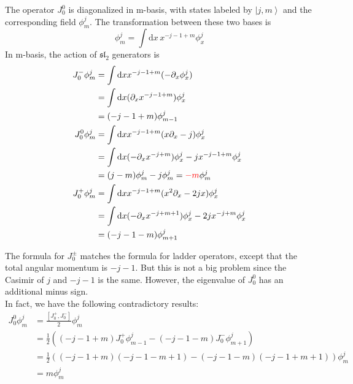 \documentclass[10pt,a4paper]{article}
\numberwithin{equation}{section}
\newcommand{\ket}[1]{\left| #1 \right\rangle}
\begin{document}
The operator $J^{0}_{0}$ is diagonalized in m-basis, with states labeled by $\ket{j,m}$ and the corresponding field $\phi^{j}_{m}$.
The transformation between these two bases is
\begin{equation}
    \phi^{j}_{m} = \int \mathrm{d} x \, x^{-j-1+m} \phi^{j}_{x}
\end{equation}
In m-basis, the action of $\mathfrak{sl}_{2}$ generators is 
\begin{equation}
    \begin{aligned}
    J^{-}_{0} \phi^{j}_{m} &= \int \mathrm{d} x x^{-j-1+m} (- \partial_{x} \phi^{j}_{x})\\
    &= \int \mathrm{d} x (\partial_{x} x^{-j-1+m}) \phi^{j}_{x}\\
    &= (-j-1+m) \phi^{j}_{m-1}\\
    J^{0}_{0} \phi^{j}_{m} &= \int \mathrm{d} x x^{-j-1+m} (x \partial_{x}-j) \phi^{j}_{x}\\
    &= \int \mathrm{d} x (-\partial_{x} x^{-j+m}) \phi^{j}_{x} -j x^{-j-1+m} \phi^{j}_{x}\\
    &= (j-m)\phi^{j}_{m} - j \phi^{j}_{m} = \textcolor{red}{-m} \phi^{j}_{m}\\
    J^{+}_{0} \phi^{j}_{m} &= \int \mathrm{d} x x^{-j-1+m} (x^{2} \partial_{x}-2jx) \phi^{j}_{x}\\
    &= \int \mathrm{d} x (-\partial_{x} x^{-j+m+1}) \phi^{j}_{x} - 2j x^{-j+m} \phi^{j}_{x}\\
    &= (-j-1-m) \phi^{j}_{m+1}
    \end{aligned}
\end{equation}

The formula for $J^{\pm}_{0}$ matches the formula for ladder operators, except that the total angular momentum is $-j-1$. But this is not 
a big problem since the Casimir of $j$ and $-j-1$ is the same. However, the eigenvalue of $J^{0}_{0}$ has an additional minus sign.\\
In fact, we have the following contradictory results:
\begin{equation}
    \begin{aligned}
    J^{0}_{0} \phi^{j}_{m} &= \frac{\left[ J^{+}_{0},J^{-}_{0}\right]}{2} \phi^{j}_{m}\\
    &= \frac{1}{2}\left( (-j-1+m) J^{+}_{0} \phi^{j}_{m-1} - (-j-1-m) J^{-}_{0} \phi^{j}_{m+1}\right)\\
    &= \frac{1}{2} \left( (-j-1+m)(-j-1-m+1)-(-j-1-m)(-j-1+m+1) \right) \phi^{j}_{m}\\
    &= m \phi^{j}_{m}\\
    \end{aligned}
\end{equation}
\end{document}
